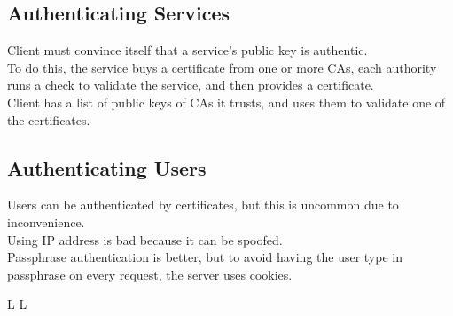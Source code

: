 \subsection{Authenticating Services}
Client must convince itself that a service's public key is authentic. \\
To do this, the service buys a certificate from one or more CAs, each authority runs a check to validate the service, and then provides a certificate. \\
Client has a list of public keys of CAs it trusts, and uses them to validate one of the certificates.
\subsection{Authenticating Users}
Users can be authenticated by certificates, but this is uncommon due to inconvenience.\\
Using IP address is bad because it can be spoofed.\\
Passphrase authentication is better, but to avoid having the user type in passphrase on every request, the server uses cookies.


\vfill \smallskip
\supereject
\if L\lr \else\null\vfill\eject\fi
\if L\lr \else\null\vfill\eject\fi
\bye


